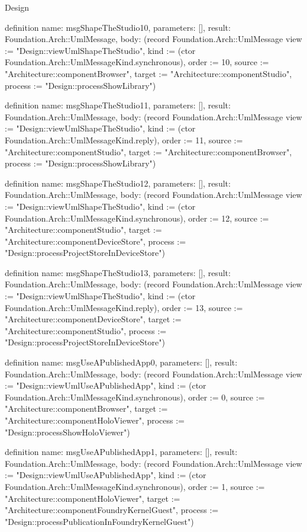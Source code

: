 \begin{lexlean}{Design}
\begin{semanticmodule}
definition{
  name: msgShapeTheStudio10,
  parameters: [],
  result: Foundation.Arch::UmlMessage,
  body: (record Foundation.Arch::UmlMessage {view := "Design::viewUmlShapeTheStudio", kind := (ctor Foundation.Arch::UmlMessageKind.synchronous), order := 10, source := "Architecture::componentBrowser", target := "Architecture::componentStudio", process := "Design::processShowLibrary"})
}

definition{
  name: msgShapeTheStudio11,
  parameters: [],
  result: Foundation.Arch::UmlMessage,
  body: (record Foundation.Arch::UmlMessage {view := "Design::viewUmlShapeTheStudio", kind := (ctor Foundation.Arch::UmlMessageKind.reply), order := 11, source := "Architecture::componentStudio", target := "Architecture::componentBrowser", process := "Design::processShowLibrary"})
}

definition{
  name: msgShapeTheStudio12,
  parameters: [],
  result: Foundation.Arch::UmlMessage,
  body: (record Foundation.Arch::UmlMessage {view := "Design::viewUmlShapeTheStudio", kind := (ctor Foundation.Arch::UmlMessageKind.synchronous), order := 12, source := "Architecture::componentStudio", target := "Architecture::componentDeviceStore", process := "Design::processProjectStoreInDeviceStore"})
}

definition{
  name: msgShapeTheStudio13,
  parameters: [],
  result: Foundation.Arch::UmlMessage,
  body: (record Foundation.Arch::UmlMessage {view := "Design::viewUmlShapeTheStudio", kind := (ctor Foundation.Arch::UmlMessageKind.reply), order := 13, source := "Architecture::componentDeviceStore", target := "Architecture::componentStudio", process := "Design::processProjectStoreInDeviceStore"})
}

definition{
  name: msgUseAPublishedApp0,
  parameters: [],
  result: Foundation.Arch::UmlMessage,
  body: (record Foundation.Arch::UmlMessage {view := "Design::viewUmlUseAPublishedApp", kind := (ctor Foundation.Arch::UmlMessageKind.synchronous), order := 0, source := "Architecture::componentBrowser", target := "Architecture::componentHoloViewer", process := "Design::processShowHoloViewer"})
}

definition{
  name: msgUseAPublishedApp1,
  parameters: [],
  result: Foundation.Arch::UmlMessage,
  body: (record Foundation.Arch::UmlMessage {view := "Design::viewUmlUseAPublishedApp", kind := (ctor Foundation.Arch::UmlMessageKind.synchronous), order := 1, source := "Architecture::componentHoloViewer", target := "Architecture::componentFoundryKernelGuest", process := "Design::processPublicationInFoundryKernelGuest"})
}


\end{semanticmodule}
\end{lexlean}
